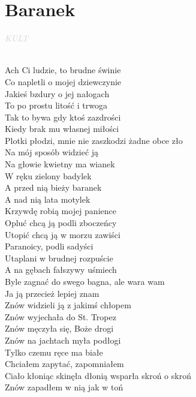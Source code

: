 \documentclass[a5paper, 10pt]{book}
\begin{document}
\section{Baranek}\textcolor{lightgray}{\textit{KULT}}\\~\\
\begin{minipage}[t]{0.8\textwidth}
  Ach Ci ludzie, to brudne świnie\\
  Co napletli o mojej dziewczynie\\
  Jakieś bzdury o jej nałogach\\
  To po prostu litość i trwoga\\
  Tak to bywa gdy ktoś zazdrości\\
  Kiedy brak mu własnej miłości\\
  Plotki płodzi, mnie nie zaszkodzi żadne obce zło\\
  Na mój sposób widzieć ją\\

  \hspace*{5mm}Na głowie kwietny ma wianek\\
  \hspace*{5mm}W ręku zielony badylek\\
  \hspace*{5mm}A przed nią bieży baranek\\
  \hspace*{5mm}A nad nią lata motylek\\

  Krzywdę robią mojej panience\\
  Opluć chcą ją podli zboczeńcy\\
  Utopić chcą ją w morzu zawiści\\
  Paranoicy, podli sadyści\\
  Utaplani w brudnej rozpuście\\
  A na gębach fałszywy uśmiech\\
  Byle zagnać do swego bagna, ale wara wam\\
  Ja ją przecież lepiej znam\\

  Znów widzieli ją z jakimś chłopem\\
  Znów wyjechała do St. Tropez\\
  Znów męczyła się, Boże drogi\\
  Znów na jachtach myła podłogi\\
  Tylko czemu ręce ma białe\\
  Chciałem zapytać, zapomniałem\\
  Ciało kłoniąc skinęła dłonią wsparła skroń o skroń\\
  Znów zapadłem w nią jak w toń\\


\end{minipage}
\end{document}
